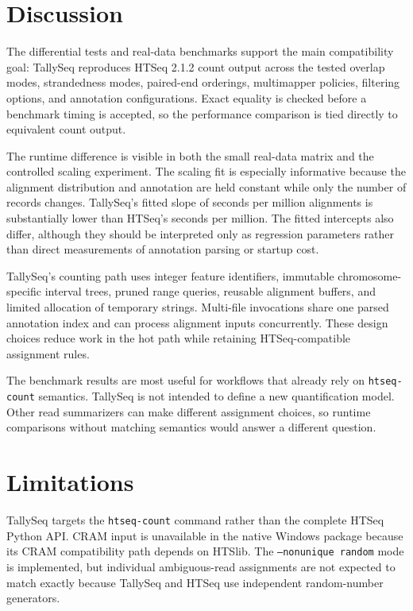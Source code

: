 \documentclass[11pt]{article}
\begin{document}
\section{Discussion}

The differential tests and real-data benchmarks support the main compatibility goal: TallySeq reproduces HTSeq 2.1.2 count output across the tested overlap modes, strandedness modes, paired-end orderings, multimapper policies, filtering options, and annotation configurations. Exact equality is checked before a benchmark timing is accepted, so the performance comparison is tied directly to equivalent count output.

The runtime difference is visible in both the small real-data matrix and the controlled scaling experiment. The scaling fit is especially informative because the alignment distribution and annotation are held constant while only the number of records changes. TallySeq's fitted slope of \ScalingTallySlope{} seconds per million alignments is substantially lower than HTSeq's \ScalingHTSeqSlope{} seconds per million. The fitted intercepts also differ, although they should be interpreted only as regression parameters rather than direct measurements of annotation parsing or startup cost.

TallySeq's counting path uses integer feature identifiers, immutable chromosome-specific interval trees, pruned range queries, reusable alignment buffers, and limited allocation of temporary strings. Multi-file invocations share one parsed annotation index and can process alignment inputs concurrently. These design choices reduce work in the hot path while retaining HTSeq-compatible assignment rules.

The benchmark results are most useful for workflows that already rely on \texttt{htseq-count} semantics. TallySeq is not intended to define a new quantification model. Other read summarizers can make different assignment choices, so runtime comparisons without matching semantics would answer a different question.

\section{Limitations}

TallySeq targets the \texttt{htseq-count} command rather than the complete HTSeq Python API. CRAM input is unavailable in the native Windows package because its CRAM compatibility path depends on HTSlib. The \texttt{--nonunique random} mode is implemented, but individual ambiguous-read assignments are not expected to match exactly because TallySeq and HTSeq use independent random-number generators.
\end{document}
